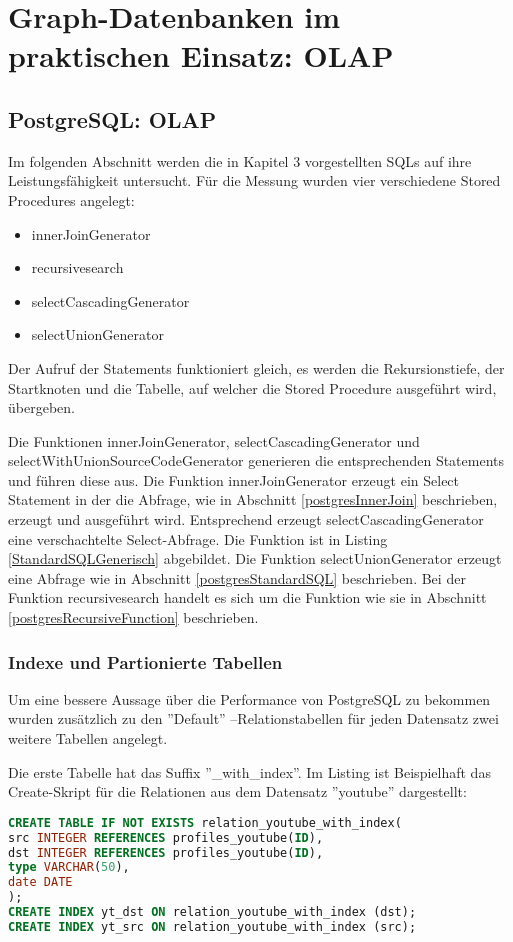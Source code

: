 \chapter{Graph-Datenbanken im praktischen Einsatz: OLAP}
\section{PostgreSQL: OLAP}
Im folgenden Abschnitt werden die in Kapitel 3 vorgestellten SQLs auf ihre Leistungsfähigkeit untersucht. Für die Messung wurden vier verschiedene Stored Procedures angelegt:
\begin{itemize}
	\item innerJoinGenerator
	\item recursivesearch
	\item selectCascadingGenerator
	\item selectUnionGenerator
\end{itemize}
Der Aufruf der Statements funktioniert gleich, es werden die Rekursionstiefe, der Startknoten und die Tabelle, auf welcher die Stored Procedure ausgeführt wird, übergeben.

Die Funktionen innerJoinGenerator, selectCascadingGenerator und selectWithUnionSourceCodeGenerator generieren die entsprechenden Statements und führen diese aus. Die Funktion innerJoinGenerator erzeugt ein Select Statement in der die Abfrage, wie in Abschnitt \ref{postgresInnerJoin} beschrieben, erzeugt und ausgeführt wird. Entsprechend erzeugt selectCascadingGenerator eine verschachtelte Select-Abfrage. Die Funktion ist in Listing \ref{StandardSQLGenerisch} abgebildet. Die Funktion selectUnionGenerator erzeugt eine Abfrage wie in Abschnitt \ref{postgresStandardSQL} beschrieben. Bei der Funktion recursivesearch handelt es sich um die Funktion wie sie in Abschnitt \ref{postgresRecursiveFunction} beschrieben.

\subsection{Indexe und Partionierte Tabellen}
Um eine bessere Aussage über die Performance von PostgreSQL zu bekommen wurden zusätzlich zu den ''Default'' --Relationstabellen für jeden Datensatz zwei weitere Tabellen angelegt.

Die erste Tabelle hat das Suffix ''\_with\_index''. Im Listing ist Beispielhaft das Create-Skript für die Relationen aus dem Datensatz ''youtube'' dargestellt:

\begin{lstlisting}[language=SQL,caption = Tabelle mit Index anlegen,frame=single, label={lineInQueryPlan} ]
CREATE TABLE IF NOT EXISTS relation_youtube_with_index(
src INTEGER REFERENCES profiles_youtube(ID),
dst INTEGER REFERENCES profiles_youtube(ID),
type VARCHAR(50),
date DATE
);
CREATE INDEX yt_dst ON relation_youtube_with_index (dst);
CREATE INDEX yt_src ON relation_youtube_with_index (src);
\end{lstlisting}


